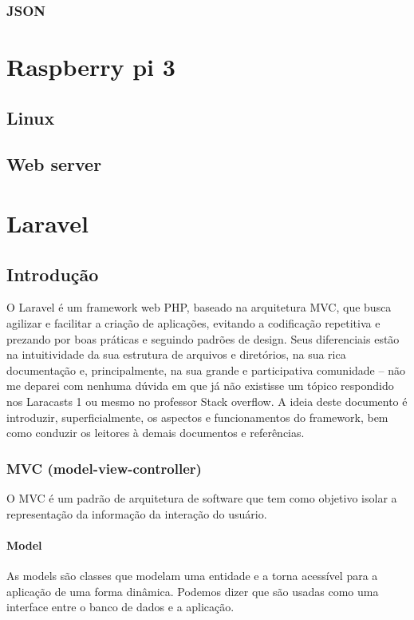 \documentclass[
12pt,				%
openany,			%
twoside,			%
a4paper,			%
english,			%
french,				%
spanish,			%
brazil,				%
]{abntex2}
\begin{document}
\subsection{JSON}

\chapter{Raspberry pi 3}

\section{Linux}

\section{Web server}
\chapter{Laravel}
\section{Introdução}
O Laravel é um framework web PHP, baseado na arquitetura MVC, que busca agilizar e
facilitar a criação de aplicações, evitando a codificação repetitiva e prezando por boas práticas
e seguindo padrões de design. Seus diferenciais estão na intuitividade da sua estrutura de
arquivos e diretórios, na sua rica documentação e, principalmente, na sua grande e
participativa comunidade – não me deparei com nenhuma dúvida em que já não existisse um
tópico respondido nos Laracasts 1 ou mesmo no professor Stack overflow.
A ideia deste documento é introduzir, superficialmente, os aspectos e funcionamentos do
framework, bem como conduzir os leitores à demais documentos e referências.
\subsection{MVC (model-view-controller)}
O MVC é um padrão de arquitetura de software que tem como objetivo isolar a
representação da informação da interação do usuário.

\subsubsection{Model}
As models são classes que modelam uma entidade e a torna acessível para a aplicação de
uma forma dinâmica. Podemos dizer que são usadas como uma interface entre o banco de
dados e a aplicação.
\end{document}
